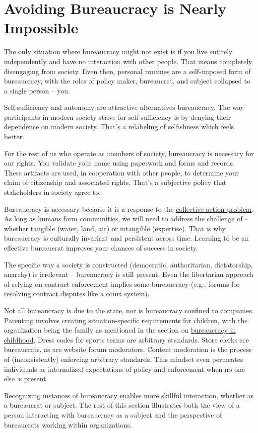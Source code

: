 

\section{Avoiding Bureaucracy is Nearly Impossible}

The only situation where bureaucracy might not exist is if you live entirely independently and have no interaction with other people. That means completely disengaging from society. Even then, personal routines are a self-imposed form of bureaucracy, with the roles of policy maker, bureaucrat, and subject collapsed to a single person -- you.

Self-sufficiency and autonomy are attractive alternatives bureaucracy. The way participants in modern society strive for self-sufficiency is by denying their dependence on modern society. That's a relabeling of selfishness which feels better. 

For the rest of us who operate as members of  society, bureaucracy is necessary for our rights. You validate your name using paperwork and forms and records. These artifacts are used, in cooperation with other people, to determine your claim of citizenship and associated rights. That's a subjective policy that \glspl{stakeholder} in society agree to. 


Bureaucracy is necessary because it is a response to the \iftoggle{WPinmargin}{\marginpar{[Wikipedia] Collective\\action problem}}{}
\href{https://en.wikipedia.org/wiki/Collective_action_problem}{collective action problem}. 
As long as humans form communities, we will need to address the challenge of \iftoggle{glossarysubstitutionworks}{\glspl{shared resource}}{shared resources}
 -- whether tangible (water, land, air) or intangible (expertise). 
That is why bureaucracy is culturally invariant and persistent across time.
Learning to be an effective bureaucrat improves your chances of success in society. 

The specific way a society is constructed (democratic, authoritarian, dictatorship, anarchy) is irrelevant -- bureaucracy is still present. Even the libertarian approach of relying on contract enforcement implies some bureaucracy (e.g., forums for resolving contract disputes like a court system). 


Not all bureaucracy is due to the state, nor is bureaucracy confined to companies. Parenting involves creating situation-specific requirements for children, with the organization being the family as mentioned in the section 
on \hyperref[sec:bureaucracy-early-childhood]{bureaucracy in childhood}.
Dress codes for sports teams are arbitrary standards. 
Store clerks are bureaucrats, as are website forum moderators.  Content moderation is the process of (inconsistently) enforcing arbitrary standards. This mindset even permeates individuals as internalized expectations of policy and enforcement when no one else is present. 

Recognizing instances of bureaucracy enables more skillful interaction, whether as a bureaucrat or subject. The rest of this section illustrates both the view of a person interacting with bureaucracy as a \gls{subject} and the perspective of bureaucrats working within organizations. 




